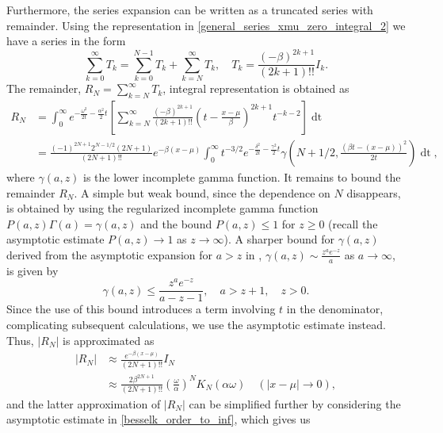 \documentclass[10pt,a4paper,oneside]{article}
\numberwithin{equation}{section}
\begin{document}
Furthermore, the series expansion can be written as a truncated series with remainder. Using the representation in \eqref{general_series_xmu_zero_integral_2} we have a series in the form
\begin{equation}
\sum_{k=0}^{\infty} T_k = \sum_{k=0}^{N-1}T_k + \sum_{k=N}^{\infty} T_k, \quad T_k = \frac{(-\beta)^{2k+1}}{(2k+1)!!} I_k.
\end{equation}
The remainder, $R_N = \sum_{k=N}^{\infty} T_k$, integral representation is obtained as
\begin{align}\label{general_xmu_remainder_integral}
R_N &= \int_0^{\infty} e^{-\frac{\omega^2}{2t} - \frac{\alpha^2}{2}t} \left[ \sum_{k=N}^{\infty}\frac{(-\beta)^{2k+1}}{(2k+1)!!} \left(t - \frac{x-\mu}{\beta}\right)^{2k+1} t^{-k-2}\right] \mathop{dt}\\
&= \frac{(-1)^{2N + 1} 2^{N - 1/2} (2N + 1)}{(2N + 1)!!} e^{-\beta(x-\mu)} \int_0^{\infty} t^{-3/2} e^{-\frac{\delta^2}{2t} - \frac{\gamma^2}{2}t} \gamma\left(N + 1/2 , \frac{(\beta t - (x-\mu))^2}{2t}\right) \mathop{dt},
\end{align}
where $\gamma(a, z)$ is the lower incomplete gamma function. It remains to bound the remainder $R_N$. A simple but weak bound, since the dependence on $N$ disappears, is obtained by using the regularized incomplete gamma function $P(a,z) \Gamma(a) = \gamma(a, z)$ and the bound $P(a, z) \le 1$ for $z \ge 0$ (recall the asymptotic estimate $P(a,z) \to 1$ as $z \to \infty$). A sharper bound for $\gamma(a, z)$ derived from the asymptotic expansion for $a > z$ in \cite[\S 7.3]{Temme2015}, $\gamma(a, z) \sim \frac{z^a e^{-z}}{a}$ as $a \to \infty$, is given by
\begin{equation}\label{lower_incomplete_gamma_bound}
\gamma(a, z) \le \frac{z^a e^{-z}}{a - z - 1}, \quad a > z + 1, \quad z > 0.
\end{equation}
Since the use of this bound introduces a term involving $t$ in the denominator, complicating subsequent calculations, we use the asymptotic estimate instead. Thus, $|R_N|$ is approximated as
\begin{align}
|R_N| &\approx \frac{e^{-\beta(x-\mu)}}{(2N + 1)!!} I_N \label{remainder_approx1}\\
&\approx \frac{2 \beta^{2N + 1}}{(2N + 1)!!}\left(\frac{\omega}{\alpha}\right)^N K_N(\alpha \omega) \quad (|x-\mu| \to 0) \label{remainder_approx2},
\end{align}
and the latter approximation of $|R_N|$ can be simplified further by considering the asymptotic estimate in \eqref{besselk_order_to_inf}, which gives us
\end{document}
